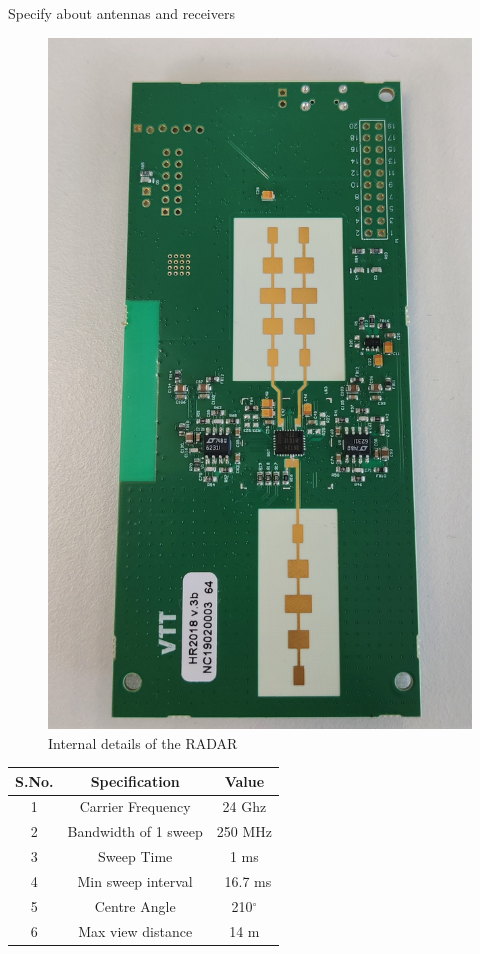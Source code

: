 Specify about antennas and receivers
\begin{figure}[ht]
  \begin{center}
    \includegraphics[scale = 0.08]{Master's thesis/images/RADAR_internal.jpg} 
    \caption{Internal details of the RADAR}
    \label{fig:AoA}
  \end{center}
\end{figure}  




\begin{center}
\begin{tabular}{ |c|c|c| }
\hline
 S.No. & Specification & Value \\ 
 \hline
1 &	Carrier Frequency	& 24 Ghz \\
2	& Bandwidth of 1 sweep	& 250 MHz\\
3 &	Sweep Time	& 1 ms\\
4 &	Min sweep interval	& ~16.7 ms\\
5 &	Centre Angle & 210$^{\circ}$  \\
6 &	Max view distance &	14 m \\
 \hline
\end{tabular}
\end{center}

